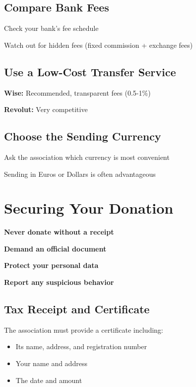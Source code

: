 \documentclass[12pt, a4paper]{article}
\begin{document}
\subsection{Compare Bank Fees}
\begin{starredlist}
    \item Check your bank's fee schedule
    \item Watch out for hidden fees (fixed commission + exchange fees)
\end{starredlist}

\subsection{Use a Low-Cost Transfer Service}
\begin{starredlist}
    \item \textbf{Wise:} Recommended, transparent fees (0.5-1\%)
    \item \textbf{Revolut:} Very competitive
\end{starredlist}

\subsection{Choose the Sending Currency}
\begin{starredlist}
    \item Ask the association which currency is most convenient
    \item Sending in Euros or Dollars is often advantageous
\end{starredlist}

\newpage

\section{Securing Your Donation}

\begin{checklist}
    \item \textbf{Never donate without a receipt}
    \item \textbf{Demand an official document}
    \item \textbf{Protect your personal data}
    \item \textbf{Report any suspicious behavior}
\end{checklist}

\subsection{Tax Receipt and Certificate}
\begin{arrowlist}
    \item The association must provide a certificate including:
    \begin{itemize}
        \item Its name, address, and registration number
        \item Your name and address
        \item The date and amount
    \end{itemize}
\end{arrowlist}
\end{document}
